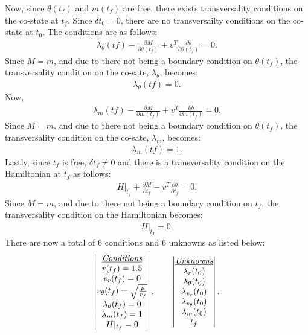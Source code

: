 \documentclass[]{article}
\begin{document}
Now, since \(\theta(t_f)\) and \(m(t_f)\) are free, there exists transversality conditions on the co-state at \(t_f\). Since \(\delta{t_0} = 0\), there are no transversailty conditions on the co-state at \(t_0\). The conditions are as follows:
\begin{align}
	\lambda_\theta(tf) - \frac{\partial M}{\partial \theta(t_f)} + v^{T}\frac{\partial b}{\partial \theta(t_f)} = 0. \nonumber
\end{align}
Since \(M = m\), and due to there not being a boundary condition on \(\theta(t_f)\), the transversality condition on the co-sate, \(\lambda_\theta\), becomes:
\begin{align}
	\lambda_\theta(tf)  = 0. \label{boundarylamtheta}
\end{align}
Now, 
\begin{align}
	\lambda_m(tf) - \frac{\partial M}{\partial m(t_f)} + v^{T}\frac{\partial b}{\partial m(t_f)} = 0. \nonumber
\end{align}
Since \(M = m\), and due to there not being a boundary condition on \(\theta(t_f)\), the transversality condition on the co-sate, \(\lambda_m\), becomes:
\begin{align}
	\lambda_m(tf) = 1. \label{boundarylamm}
\end{align}
Lastly, since \(t_f\) is free, \(\delta{t_f} \neq 0\) and there is a transversality condition on the Hamiltonian at \(t_f\) as follows: 
\begin{align}
	H|_{t_f} + \frac{\partial M}{\partial t_f} - v^{T}\frac{\partial b}{\partial t_f} = 0.  \nonumber
\end{align}
Since \(M = m\), and due to there not being a boundary condition on \(t_f\), the transversality condition on the Hamiltonian becomes:
\begin{align}
	H|_{t_f} = 0  \label{boundaryH}.
\end{align}
There are now a total of 6 conditions and 6 unknowns as listed below:
 \[
 \begin{vmatrix}
 	\emph{\underline{Conditions}}\\
 	r(t_f)              = 1.5\\
 	v_r(t_f)            = 0\\
 	v_{\theta}(t_f)     =\sqrt{\frac{\mu}{r_f}}\\
 	\lambda_\theta(t_f) = 0\\
 	\lambda_m(t_f)      = 1\\
 	H|_{t_f}            = 0\\
 \end{vmatrix},
\qquad
 \begin{vmatrix}
 	\emph{\underline{Unknowns}}\\
	\lambda_{r}(t_0)\\
	\lambda_{\theta}(t_0)\\
	\lambda_{v_r}(t_0)\\
	\lambda_{v_{\theta}}(t_0)\\
	\lambda_{m}(t_0)\\
	t_f\\
 \end{vmatrix}.
 \]
\end{document}
